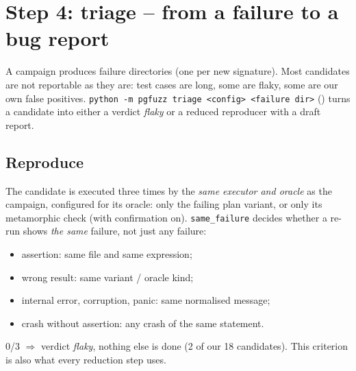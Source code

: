 \section{Step 4: triage -- from a failure to a bug report}
\label{sec:triage}

A campaign produces failure directories (one per new signature). Most
candidates are not reportable as they are: test cases are long, some are
flaky, some are our own false positives. \texttt{python -m pgfuzz triage
<config> <failure dir>} () turns a candidate
into either a verdict \emph{flaky} or a reduced reproducer with a draft report.

\begin{center}
\end{center}

\subsection{Reproduce}

The candidate is executed three times by the \emph{same executor and oracle}
as the campaign, configured for its oracle: only the failing plan variant, or
only its metamorphic check (with confirmation on). \texttt{same\_failure}
decides whether a re-run shows \emph{the same} failure, not just any failure:
\begin{itemize}
  \item assertion: same file and same expression;
  \item wrong result: same variant / oracle kind;
  \item internal error, corruption, panic: same normalised message;
  \item crash without assertion: any crash of the same statement.
\end{itemize}
0/3 $\Rightarrow$ verdict \emph{flaky}, nothing else is done (2 of our 18
candidates). This criterion is also what every reduction step uses.


